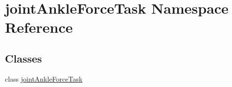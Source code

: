 \hypertarget{namespacejoint_ankle_force_task}{}\section{joint\+Ankle\+Force\+Task Namespace Reference}
\label{namespacejoint_ankle_force_task}
\subsection*{Classes}
\begin{DoxyCompactItemize}
\item 
class \hyperlink{classjoint_ankle_force_task_1_1joint_ankle_force_task}{joint\+Ankle\+Force\+Task}
\end{DoxyCompactItemize}
